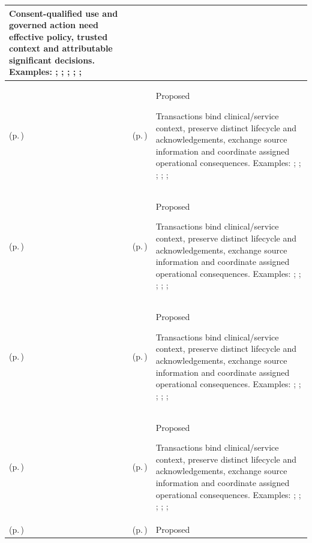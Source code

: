 \begin{longtable}{|>{\raggedright\arraybackslash}p{0.27\TableWidth}|>{\raggedright\arraybackslash}p{0.27\TableWidth}|>{\raggedright\arraybackslash}p{0.46\TableWidth}|}
Consent-qualified use and governed action need effective policy, trusted context and attributable significant decisions. Examples: \nameref{feature:feat-ise-11}; \nameref{feature:feat-ise-12}; \nameref{feature:feat-ise-13}; \nameref{function:evaluate-information-access-authority}; \nameref{service:policy-evaluation-authorisation-service}; \nameref{function:evaluate-consent-constraint}\\\hline
\nameref{cap:bec-referral-administration} (p.\,\pageref{cap:bec-referral-administration}) & \nameref{cap:ec-02} (p.\,\pageref{cap:ec-02}) & Proposed

Transactions bind clinical/service context, preserve distinct lifecycle and acknowledgements, exchange source information and coordinate assigned operational consequences. Examples: \nameref{feature:feat-sa-03}; \nameref{feature:feat-sa-04}; \nameref{feature:feat-sa-05}; \nameref{function:receive-referral}; \nameref{service:referral-submission-service}; \nameref{function:assemble-referral-context}\\\hline
\nameref{cap:bec-referral-administration} (p.\,\pageref{cap:bec-referral-administration}) & \nameref{cap:ec-03} (p.\,\pageref{cap:ec-03}) & Proposed

Transactions bind clinical/service context, preserve distinct lifecycle and acknowledgements, exchange source information and coordinate assigned operational consequences. Examples: \nameref{feature:feat-sa-03}; \nameref{feature:feat-sa-04}; \nameref{feature:feat-sa-05}; \nameref{function:receive-referral}; \nameref{service:referral-submission-service}; \nameref{function:assemble-referral-context}\\\hline
\nameref{cap:bec-referral-administration} (p.\,\pageref{cap:bec-referral-administration}) & \nameref{cap:ec-08} (p.\,\pageref{cap:ec-08}) & Proposed

Transactions bind clinical/service context, preserve distinct lifecycle and acknowledgements, exchange source information and coordinate assigned operational consequences. Examples: \nameref{feature:feat-sa-03}; \nameref{feature:feat-sa-04}; \nameref{feature:feat-sa-05}; \nameref{function:receive-referral}; \nameref{service:referral-submission-service}; \nameref{function:assemble-referral-context}\\\hline
\nameref{cap:bec-referral-administration} (p.\,\pageref{cap:bec-referral-administration}) & \nameref{cap:ec-10} (p.\,\pageref{cap:ec-10}) & Proposed

Transactions bind clinical/service context, preserve distinct lifecycle and acknowledgements, exchange source information and coordinate assigned operational consequences. Examples: \nameref{feature:feat-sa-03}; \nameref{feature:feat-sa-04}; \nameref{feature:feat-sa-05}; \nameref{function:receive-referral}; \nameref{service:referral-submission-service}; \nameref{function:assemble-referral-context}\\\hline
\nameref{cap:bec-order-administration} (p.\,\pageref{cap:bec-order-administration}) & \nameref{cap:ec-02} (p.\,\pageref{cap:ec-02}) & Proposed


\end{longtable}
